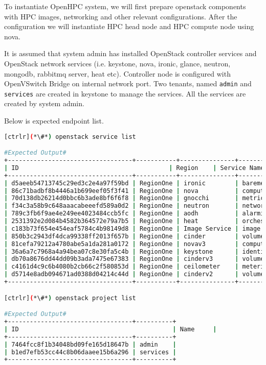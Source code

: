 To instantiate OpenHPC system, we will first prepare openstack components with HPC images, networking and other relevant configurations. After the configuration we will instantiate HPC head node and HPC compute node using nova. 

It is assumed that system admin has installed OpenStack controller services and OpenStack network services (i.e. keystone, nova, ironic, glance, neutron, mongodb, rabbitmq server, heat etc). 
Controller node is configured with OpenVSwitch Bridge on internal network port. 
Two tenants, named \texttt{admin} and \texttt{services} are created in keystone to manage the services. All the services are created by system admin. 

Below is expected endpoint list.



\begin{lstlisting}[language=bash,keywords={}]
[ctrlr](*\#*) openstack service list

#Expected Output#
+----------------------------------+-----------+---------------+---------------+
| ID                                         | Region    | Service Name  | Service Type  |
+----------------------------------+-----------+---------------+---------------+
| d5aeeb54713745c29ed3c2e4a97f59bd | RegionOne | ironic        | baremetal     |
| 86c71badbf8b4446a1b699eef05f3f41 | RegionOne | nova          | compute       |
| 70d138db26214d0bbc6b3ade8bf6f6f8 | RegionOne | gnocchi       | metric        |
| f34c3a58b9c648aaacabeeefd589a0d2 | RegionOne | neutron       | network       |
| 789c3fb6f9ae4e249ee4023484ccb5fc | RegionOne | aodh          | alarming      |
| 2531392e2d084b4582b364572e79a7b5 | RegionOne | heat          | orchestration |
| c183b73f654e454eaf5784c4b98149d8 | RegionOne | Image Service | image         |
| 850b3c2943df4dca99338ff2013f657b | RegionOne | cinder        | volume        |
| 81cefa79212a4780abe5a1da281a0172 | RegionOne | novav3        | computev3     |
| 36a6a7c7968a4a94bea07c8e30fa5c4b | RegionOne | keystone      | identity      |
| db70a8676dd44dd09b3ada7475e67383 | RegionOne | cinderv3      | volumev3      |
| c4161d4c9c6b4080b2cb66c2f580853d | RegionOne | ceilometer    | metering      |
| d5714e8adb094671ad0388d04214c44d | RegionOne | cinderv2      | volumev2      |
+----------------------------------+-----------+---------------+---------------+

[ctrlr](*\#*) openstack project list

#Expected Output#
+----------------------------------+----------+
| ID                                          | Name     |
+----------------------------------+----------+
| 7464fcc8f1b34048bd09fe165d18647b | admin    |
| b1ed7efb53cc44c8b06daaee15b6a296 | services |
+----------------------------------+----------+
\end{lstlisting}

